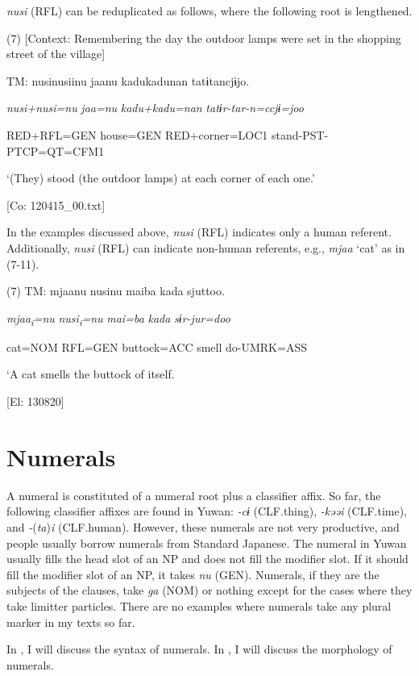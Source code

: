 \textit{nusi} (RFL) can be reduplicated as follows, where the following root is lengthened.

(7)  [Context: Remembering the day the outdoor lamps were set in the shopping street of the village]

  TM:  nusinusiinu  jaanu  kadukadunan  tatɨtancjɨjo.

    \textit{nusi+nusi=nu}  \textit{jaa=nu}  \textit{kadu+kadu=nan}  \textit{tatɨr-tar-n=ccjɨ=joo}

    RED+RFL=GEN  house=GEN  RED+corner=LOC1  stand-PST-PTCP=QT=CFM1

    ‘(They) stood (the outdoor lamps) at each corner of each one.’

    [Co: 120415\_00.txt]

  In the examples discussed above, \textit{nusi} (RFL) indicates only a human referent. Additionally, \textit{nusi} (RFL) can indicate non-human referents, e.g., \textit{mjaa} ‘cat’ as in (7-11).

(7)  TM:  mjaanu  nusinu  maiba  kada  sjuttoo.

    \textit{mjaa\textsubscript{i}}\textit{=nu}  \textit{nusi\textsubscript{i}}\textit{=nu}  \textit{mai=ba}  \textit{kada}  \textit{sɨr-jur=doo}

    cat=NOM  RFL=GEN  buttock=ACC  smell  do-UMRK=ASS

    ‘A cat smells the buttock of itself.

    [El: 130820]

\section{Numerals}

A numeral is constituted of a numeral root plus a classifier affix. So far, the following classifier affixes are found in Yuwan: \textit{{}-cɨ} (CLF.thing), \textit{{}-kəəi} (CLF.time), and \textit{{}-}(\textit{ta})\textit{i} (CLF.human). However, these numerals are not very productive, and people usually borrow numerals from Standard Japanese. The numeral in Yuwan usually fills the head slot of an NP and does not fill the modifier slot. If it should fill the modifier slot of an NP, it takes \textit{nu} (GEN). Numerals, if they are the subjects of the clauses, take \textit{ga} (NOM) or nothing except for the cases where they take limitter particles. There are no examples where numerals take any plural marker in my texts so far.

  In , I will discuss the syntax of numerals. In , I will discuss the morphology of numerals.

